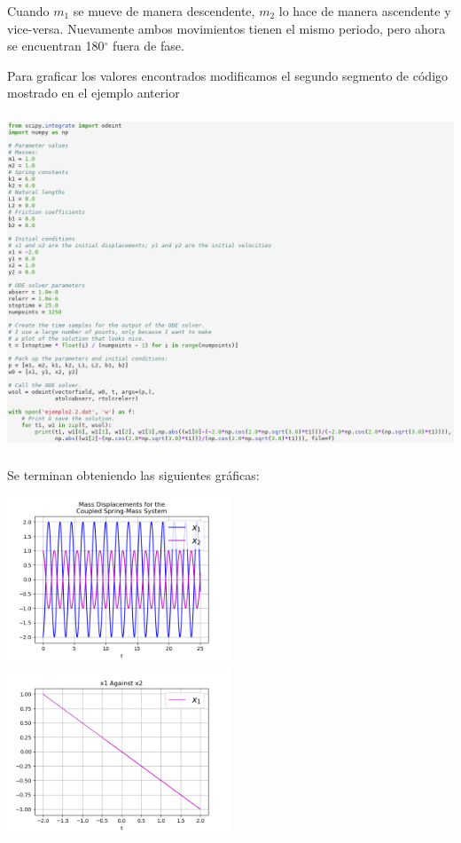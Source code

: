 \documentclass{article}
\begin{document}
Cuando $m_1$ se mueve de manera descendente, $m_2$ lo hace de manera ascendente y vice-versa. Nuevamente ambos movimientos tienen el mismo periodo, pero ahora se encuentran 180$^\circ$ fuera de fase. 

Para graficar los valores encontrados modificamos el segundo segmento de código mostrado en el ejemplo anterior

    \begin{center}
    \includegraphics[height=10cm]{point22.png}
    \end{center} 

Se terminan obteniendo las siguientes gráficas:

\begin{center}
\includegraphics[height=5cm]{ejemplo2_2_p1.png}
\includegraphics[height=5cm]{ejemplo2_2_p2.png}
\end{center}
\end{document}
